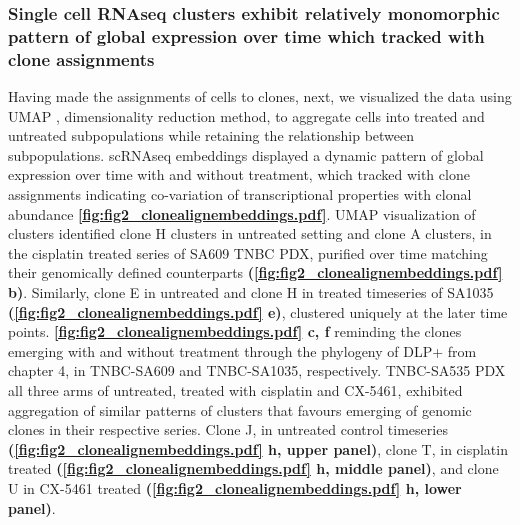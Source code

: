  
\subsubsection{Single cell RNAseq clusters exhibit relatively monomorphic pattern of global expression over time which tracked with clone assignments}

Having made the assignments of cells to clones, next, we visualized the data using UMAP \cite{becht2019dimensionality}, dimensionality reduction method, to aggregate cells into treated and untreated subpopulations while retaining the relationship between subpopulations. scRNAseq embeddings displayed a dynamic pattern of global expression over time with and without treatment, which tracked with clone assignments indicating co-variation of transcriptional properties with clonal abundance \textbf{\autoref{fig:fig2_clonealignembeddings.pdf}}. UMAP visualization of clusters identified clone H clusters in untreated setting and clone A clusters, in the cisplatin treated series of SA609 TNBC PDX, purified over time matching their genomically defined counterparts \textbf{(\autoref{fig:fig2_clonealignembeddings.pdf} b)}. Similarly, clone E in untreated and clone H in treated timeseries of SA1035  \textbf{(\autoref{fig:fig2_clonealignembeddings.pdf} e)}, clustered uniquely at the later time points. \textbf{\autoref{fig:fig2_clonealignembeddings.pdf} c, f} reminding the clones emerging with and without treatment through the phylogeny of DLP+ from chapter 4, in TNBC-SA609 and TNBC-SA1035, respectively.  TNBC-SA535  PDX all three arms of untreated, treated with cisplatin and CX-5461, exhibited aggregation of similar patterns of clusters that favours emerging of genomic clones in their respective series. Clone J, in untreated control timeseries \textbf{(\autoref{fig:fig2_clonealignembeddings.pdf} h, upper panel)}, clone T, in cisplatin treated \textbf{(\autoref{fig:fig2_clonealignembeddings.pdf} h, middle panel)}, and clone U in CX-5461 treated \textbf{(\autoref{fig:fig2_clonealignembeddings.pdf} h, lower panel)}.



